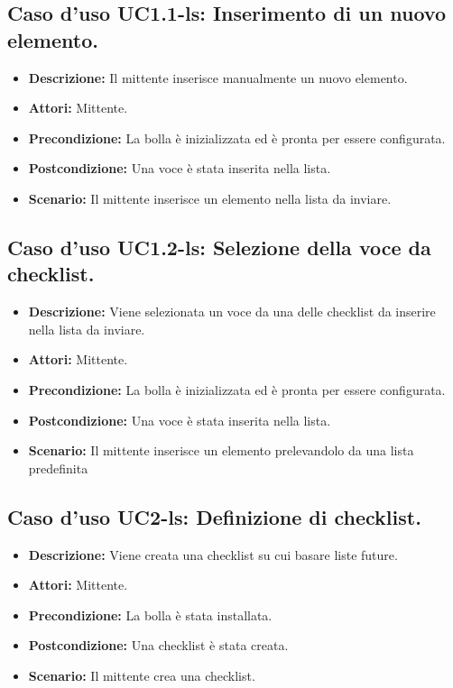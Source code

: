 \subsection{Caso d'uso UC1.1-ls: Inserimento di un nuovo elemento.}
\begin{itemize}
\item[]\textbf{Descrizione:} Il mittente inserisce manualmente un nuovo elemento.
\item[]\textbf{Attori:} Mittente. 
\item[]\textbf{Precondizione:} La bolla è inizializzata ed è pronta per essere configurata. 
\item[]\textbf{Postcondizione:} Una voce è stata inserita nella lista. 
\item[]\textbf{Scenario:}
Il mittente inserisce un elemento nella lista da inviare. 
\end{itemize}

\subsection{Caso d'uso UC1.2-ls: Selezione della voce da checklist.}
\begin{itemize}
\item[]\textbf{Descrizione:} Viene selezionata un voce da una delle checklist da inserire nella lista da inviare.
\item[]\textbf{Attori:} Mittente. 
\item[]\textbf{Precondizione:} La bolla è inizializzata ed è pronta per essere configurata. 
\item[]\textbf{Postcondizione:} Una voce è stata inserita nella lista. 
\item[]\textbf{Scenario:}
Il mittente inserisce un elemento prelevandolo da una lista predefinita 
\end{itemize}

\subsection{Caso d'uso UC2-ls: Definizione di checklist.}
\begin{itemize}
\item[]\textbf{Descrizione:} Viene creata una checklist su cui basare liste future.
\item[]\textbf{Attori:} Mittente. 
\item[]\textbf{Precondizione:} La bolla è stata installata. 
\item[]\textbf{Postcondizione:} Una checklist è stata creata. 
\item[]\textbf{Scenario:}
Il mittente crea una checklist. 
\end{itemize}

